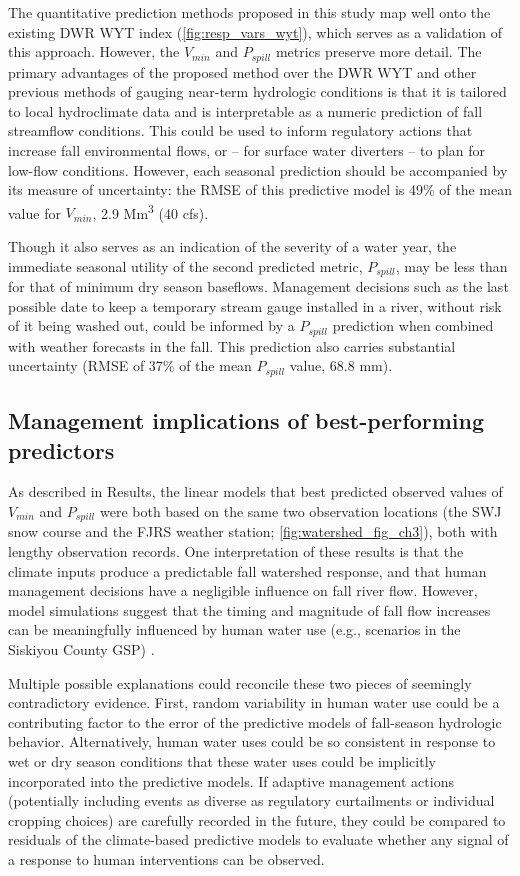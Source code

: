 \documentclass[hess, manuscript]{copernicus}
\begin{document}
The quantitative prediction methods proposed in this study map well onto
the existing DWR WYT index (\autoref{fig:resp_vars_wyt}), which serves
as a validation of this approach. However, the \(V_{min}\) and
\(P_{spill}\) metrics preserve more detail. The primary advantages of
the proposed method over the DWR WYT and other previous methods of
gauging near-term hydrologic conditions is that it is tailored to local
hydroclimate data and is interpretable as a numeric prediction of fall
streamflow conditions. This could be used to inform regulatory actions
that increase fall environmental flows, or -- for surface water
diverters -- to plan for low-flow conditions. However, each seasonal
prediction should be accompanied by its measure of uncertainty: the RMSE
of this predictive model is 49\% of the mean value for \(V_{min}\), 2.9
Mm\textsuperscript{3} (40 cfs).

Though it also serves as an indication of the severity of a water year,
the immediate seasonal utility of the second predicted metric,
\(P_{spill}\), may be less than for that of minimum dry season
baseflows. Management decisions such as the last possible date to keep a
temporary stream gauge installed in a river, without risk of it being
washed out, could be informed by a \(P_{spill}\) prediction when
combined with weather forecasts in the fall. This prediction also
carries substantial uncertainty (RMSE of 37\% of the mean \(P_{spill}\)
value, 68.8 mm).

\subsection{Management implications of best-performing predictors}

As described in Results, the linear models that best predicted observed
values of \(V_{min}\) and \(P_{spill}\) were both based on the same two
observation locations (the SWJ snow course and the FJRS weather station;
\autoref{fig:watershed_fig_ch3}), both with lengthy observation records.
One interpretation of these results is that the climate inputs produce a
predictable fall watershed response, and that human management decisions
have a negligible influence on fall river flow. However, model
simulations suggest that the timing and magnitude of fall flow increases
can be meaningfully influenced by human water use (e.g., scenarios in
the Siskiyou County GSP) \citeyearpar[Siskiyou
County][]{SiskiyouCounty2021}.

Multiple possible explanations could reconcile these two pieces of
seemingly contradictory evidence. First, random variability in human
water use could be a contributing factor to the error of the predictive
models of fall-season hydrologic behavior. Alternatively, human water
uses could be so consistent in response to wet or dry season conditions
that these water uses could be implicitly incorporated into the
predictive models. If adaptive management actions (potentially including
events as diverse as regulatory curtailments or individual cropping
choices) are carefully recorded in the future, they could be compared to
residuals of the climate-based predictive models to evaluate whether any
signal of a response to human interventions can be observed.
\end{document}
